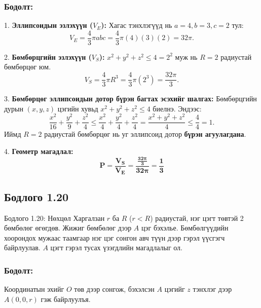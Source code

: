 \documentclass[11pt,a4paper]{article}
\begin{document}
\subsubsection*{Бодолт:}

1. 				\textbf{Эллипсоидын эзлэхүүн ($V_E$):}
   Хагас тэнхлэгүүд нь $a = 4, b = 3, c = 2$ тул:
   \[
     V_E = \frac{4}{3} \pi a b c = \frac{4}{3} \pi (4)(3)(2) = 32\pi.
   \]

2. 				\textbf{Бөмбөрцгийн эзлэхүүн ($V_S$):}
   $x^2 + y^2 + z^2 \le 4 = 2^2$ муж нь $R = 2$ радиустай бөмбөрцөг юм.
   \[
     V_S = \frac{4}{3} \pi R^3 = \frac{4}{3} \pi (2^3) = \frac{32\pi}{3}.
   \]

3. 				\textbf{Бөмбөрцөг эллипсоидын дотор бүрэн багтах эсэхийг шалгах:}
   Бөмбөрцгийн дурын $(x, y, z)$ цэгийн хувьд $x^2 + y^2 + z^2 \le 4$ биелнэ. Эндээс:
   \[
     \frac{x^2}{16} + \frac{y^2}{9} + \frac{z^2}{4} \le \frac{x^2}{4} + \frac{y^2}{4} + \frac{z^2}{4} = \frac{x^2 + y^2 + z^2}{4} \le \frac{4}{4} = 1.
   \]
   Иймд $R=2$ радиустай бөмбөрцөг нь уг эллипсоид дотор 				\textbf{бүрэн агуулагдана}.

4. 				\textbf{Геометр магадлал:}
   \[
     \mathbf{P = \frac{V_S}{V_E} = \frac{\frac{32\pi}{3}}{32\pi} = \frac{1}{3}}
   \]

\vspace{0.8em}

\subsection*{Бодлого 1.20}

\begin{problembox}{Бодлого 1.20: Нөхцөл}
Харгалзан $r$ ба $R$ ($r < R$) радиустай, нэг цэгт төвтэй 2 бөмбөлөг өгөгдөв. Жижиг бөмбөлөг дээр $A$ цэг бэхэлье. Бөмбөлгүүдийн хоорондох мужаас таамгаар нэг цэг сонгон авч түүн дээр гэрэл үүсгэгч байрлуулав. $A$ цэгт гэрэл тусах үзэгдлийн магадлалыг ол.
\end{problembox}

\subsubsection*{Бодолт:}

Координатын эхийг $O$ төв дээр сонгож, бэхэлсэн $A$ цэгийг $z$ тэнхлэг дээр $A(0, 0, r)$ гэж байрлуулъя.
\end{document}
